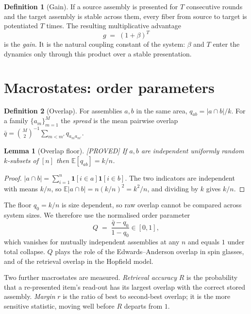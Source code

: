 \documentclass[11pt]{article}
\theoremstyle{definition}
\newtheorem{definition}{Definition}
\theoremstyle{plain}
\newtheorem{lemma}{Lemma}
\newcommand{\PROVED}{\textnormal{\footnotesize\textsf{[PROVED]}}}
\newcommand{\E}{\mathbb{E}}
\begin{document}
\begin{definition}[Gain]\label{def:gain}
If a source assembly is presented for $T$ consecutive rounds and the target
assembly is stable across them, every fiber from source to target is
potentiated $T$ times. The resulting multiplicative advantage
\[
  \boxed{\,g \;=\; (1+\beta)^T\,}
\]
is the \emph{gain}. It is the natural coupling constant of the system: $\beta$
and $T$ enter the dynamics only through this product over a stable
presentation.
\end{definition}

\section{Macrostates: order parameters}

\begin{definition}[Overlap]
For assemblies $a,b$ in the same area, $q_{ab} = |a \cap b| / k$. For a family
$\{a_m\}_{m=1}^{M}$ the \emph{spread} is the mean pairwise overlap
$\bar q = \binom{M}{2}^{-1}\sum_{m<m'} q_{a_m a_{m'}}$.
\end{definition}

\begin{lemma}[Overlap floor]\label{lem:floor} \PROVED
If $a,b$ are independent uniformly random $k$-subsets of $[n]$ then
$\E[q_{ab}] = k/n$.
\end{lemma}
\begin{proof}
$|a \cap b| = \sum_{i=1}^{n} \mathbf{1}[i \in a]\mathbf{1}[i \in b]$. The two
indicators are independent with means $k/n$, so $\E|a\cap b| = n(k/n)^2 =
k^2/n$, and dividing by $k$ gives $k/n$.
\end{proof}

The floor $q_0 = k/n$ is size dependent, so raw overlap cannot be compared
across system sizes. We therefore use the normalised order parameter
\begin{equation}\label{eq:Q}
  Q \;=\; \frac{\bar q - q_0}{1 - q_0} \in [0,1],
\end{equation}
which vanishes for mutually independent assemblies at any $n$ and equals $1$
under total collapse. $Q$ plays the role of the Edwards--Anderson overlap in
spin glasses, and of the retrieval overlap in the Hopfield model.

Two further macrostates are measured. \emph{Retrieval accuracy} $R$ is the
probability that a re-presented item's read-out has its largest overlap with
the correct stored assembly. \emph{Margin} $r$ is the ratio of best to
second-best overlap; it is the more sensitive statistic, moving well before $R$
departs from $1$.
\end{document}

